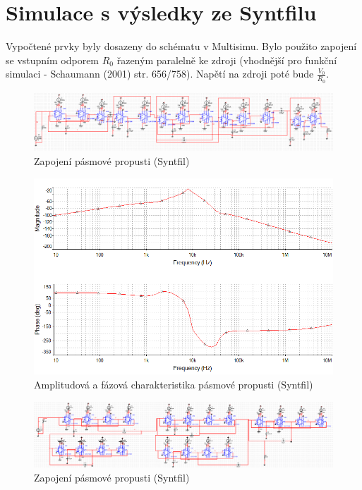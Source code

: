 \documentclass[twoside]{article}
\begin{document}
\section{Simulace s výsledky ze Syntfilu}
\noindent Vypočtené prvky byly dosazeny do schématu v Multisimu. Bylo použito zapojení se vstupním odporem $R_0$ řazeným paralelně ke zdroji (vhodnější pro funkční simulaci - Schaumann (2001) str. 656/758). Napětí na zdroji poté bude $\frac{V_0}{R_0}$.
\begin{figure}[H]
\centering
\includegraphics[scale=0.55]{maple.png}
\caption{Zapojení pásmové propusti (Syntfil)}
\end{figure}
\begin{figure}[H]
\centering
\includegraphics[scale=0.6]{maple2.png}
\caption{Amplitudová a fázová charakteristika pásmové propusti (Syntfil)}
\end{figure}
\begin{figure}[H]
\centering
\includegraphics[scale=0.55]{maple4.png}
\caption{Zapojení pásmové propusti (Syntfil)}
\end{figure}
\end{document}

